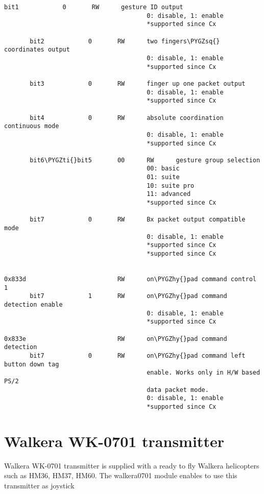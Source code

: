 \documentclass[a4paper,8pt,english]{sphinxmanual}
\def\PYGZhy{\char`\-}
\def\PYGZsq{\char`\'}
\def\PYGZti{\char`\~}
\renewcommand\PYGZsq{\textquotesingle}
\begin{document}
\begin{Verbatim}[commandchars=\\\{\}]
       bit1            0       RW      gesture ID output
                                       0: disable, 1: enable
                                       *supported since Cx

       bit2            0       RW      two fingers\PYGZsq{} coordinates output
                                       0: disable, 1: enable
                                       *supported since Cx

       bit3            0       RW      finger up one packet output
                                       0: disable, 1: enable
                                       *supported since Cx

       bit4            0       RW      absolute coordination continuous mode
                                       0: disable, 1: enable
                                       *supported since Cx

       bit6\PYGZti{}bit5       00      RW      gesture group selection
                                       00: basic
                                       01: suite
                                       10: suite pro
                                       11: advanced
                                       *supported since Cx

       bit7            0       RW      Bx packet output compatible mode
                                       0: disable, 1: enable
                                       *supported since Cx
                                       *supported since Cx


0x833d                         RW      on\PYGZhy{}pad command control 1
       bit7            1       RW      on\PYGZhy{}pad command detection enable
                                       0: disable, 1: enable
                                       *supported since Cx

0x833e                         RW      on\PYGZhy{}pad command detection
       bit7            0       RW      on\PYGZhy{}pad command left button down tag
                                       enable. Works only in H/W based PS/2
                                       data packet mode.
                                       0: disable, 1: enable
                                       *supported since Cx
\end{Verbatim}


\section{Walkera WK-0701 transmitter}
\label{input/devices/walkera0701:walkera-wk-0701-transmitter}\label{input/devices/walkera0701::doc}
Walkera WK-0701 transmitter is supplied with a ready to fly Walkera
helicopters such as HM36, HM37, HM60. The walkera0701 module enables to use
this transmitter as joystick
\end{document}
